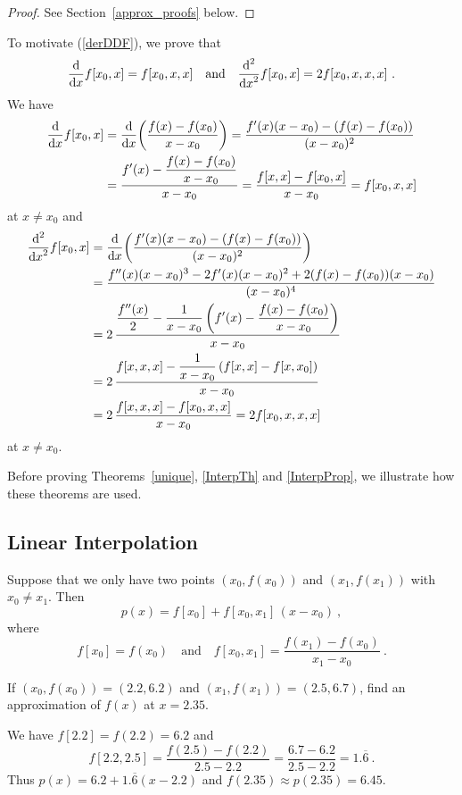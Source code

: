 \begin{proof}
See Section~\ref{approx_proofs} below.
\end{proof}

To motivate (\ref{derDDF}), we prove that
\[
\dfdx{f[x_0,x]}{x} = f[x_0,x,x] \quad \text{and} \quad
\dfdxn{f[x_0,x]}{x}{2} = 2 f[x_0,x,x,x] \ .
\]
We have
\begin{align*}
\dfdx{f[x_0,x]}{x} &= \dfdx{\left(\frac{f(x)-f(x_0)}{x-x_0}\right)}{x}
= \frac{f'(x) (x-x_0) - ( f(x)- f(x_0) )}{(x-x_0)^2} \\
&= \frac{\DS  f'(x) - \frac{f(x)-f(x_0)}{x-x_0}}{x-x_0}
= \frac{f[x,x] - f[x_0,x]}{x-x_0} = f[x_0,x,x]
\end{align*}
at $x\neq x_0$ and
\begin{align*}
\dfdxn{f[x_0,x]}{x}{2} &= \dfdx{\left(
\frac{f'(x) (x-x_0) - ( f(x)- f(x_0) )}{(x-x_0)^2}\right)}{x} \\
&= \frac{f''(x)(x-x_0)^3 - 2 f'(x) (x-x_0)^2 +  2(f(x)- f(x_0))(x-x_0)}
{(x-x_0)^4}\\
&= 2\, \frac{\DS \frac{f''(x)}{2} -
\frac{1}{x-x_0}\left(f'(x) - \frac{f(x)- f(x_0)}{x-x_0}\right)}{x-x_0}\\
&= 2\, \frac{\DS f[x,x,x] -
\frac{1}{x-x_0}\left(f[x,x] - f[x,x_0]\right)}{x-x_0}\\
&= 2\, \frac{f[x,x,x] - f[x_0,x,x]}{x-x_0} = 2 f[x_0,x,x,x]
\end{align*}
at $x \neq x_0$.

Before proving Theorems~\ref{unique}, \ref{InterpTh} and
\ref{InterpProp}, we illustrate how these theorems are used.

\subsection{Linear Interpolation}

Suppose that we only have two points $(x_0,f(x_0))$ and $(x_1,f(x_1))$
with $x_0\neq x_1$.  Then
\[
p(x)=f[x_0]+f[x_0,x_1]\,(x-x_0) \ ,
\]
where
\[
f[x_0]  = f(x_0)
\quad \text{and} \quad
f[x_0,x_1] =\frac{f(x_1)-f(x_0)}{x_1-x_0} \ .
\]

\begin{egg}
If $(x_0,f(x_0))= (2.2,6.2)$ and $(x_1,f(x_1)) = (2.5,6.7)$, find an
approximation of $f(x)$ at $x = 2.35$.

We have $f[2.2]= f(2.2) = 6.2$ and 
\[
f[2.2,2.5]=\frac{f(2.5)-f(2.2)}{2.5-2.2}
=\frac{6.7-6.2}{2.5-2.2}=1.\overline{6} \ .
\]
Thus $p(x)=6.2+1.\overline{6}(x-2.2)$ and
$f(2.35) \approx p(2.35) = 6.45$.
\end{egg}

